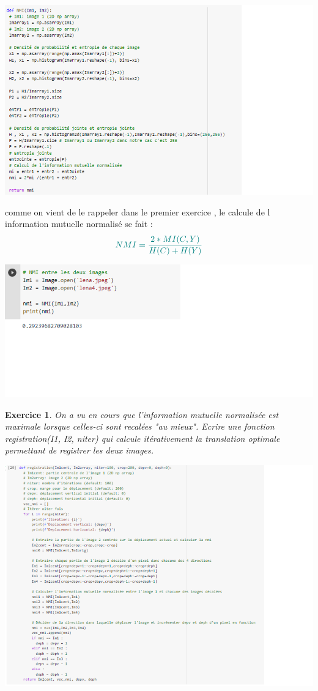 \documentclass[a4paper,10pt]{scrartcl}
\theoremstyle{plain}
\newtheorem{exo}{Exercice}
\begin{document}
\centerline{\includegraphics[width=20cm]{sal.png}}
comme on vient de le rappeler dans le premier exercice , le calcule de l information mutuelle normalisé se fait :
\[
\textcolor{teal}{ NMI = \frac{2*MI(C,Y)}{H(C)+H(Y)}}
\]

 
\centerline{\includegraphics[width=18cm]{sa.png}}



\begin{exo}
On a vu en cours que l'information mutuelle normalisée est maximale lorsque celles-ci sont recalées "au mieux". Ecrire une fonction registration(I1, I2, niter) qui calcule itérativement la translation optimale permettant de registrer les deux images.
\end{exo}

\centerline{\includegraphics[width=19cm]{say.png}}
\end{document}
